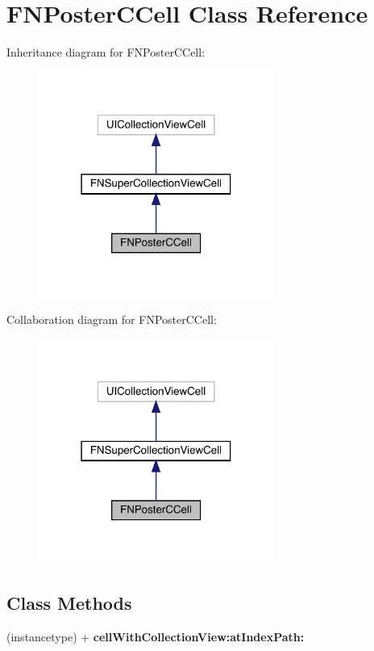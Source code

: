 \hypertarget{interface_f_n_poster_c_cell}{}\section{F\+N\+Poster\+C\+Cell Class Reference}
\label{interface_f_n_poster_c_cell}


Inheritance diagram for F\+N\+Poster\+C\+Cell\+:\nopagebreak
\begin{figure}[H]
\begin{center}
\leavevmode
\includegraphics[width=219pt]{interface_f_n_poster_c_cell__inherit__graph}
\end{center}
\end{figure}


Collaboration diagram for F\+N\+Poster\+C\+Cell\+:\nopagebreak
\begin{figure}[H]
\begin{center}
\leavevmode
\includegraphics[width=219pt]{interface_f_n_poster_c_cell__coll__graph}
\end{center}
\end{figure}
\subsection*{Class Methods}
\begin{DoxyCompactItemize}
\item 
\mbox{\label{interface_f_n_poster_c_cell_ab5c04168ccf5ee684ca7c249eaca2dba}} 
(instancetype) + {\bfseries cell\+With\+Collection\+View\+:at\+Index\+Path\+:}
\end{DoxyCompactItemize}
